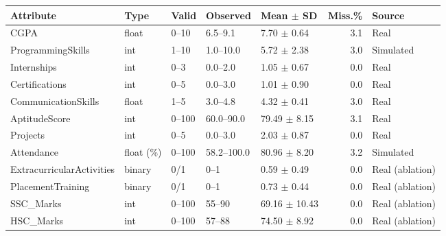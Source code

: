 \scriptsize
\setlength{\tabcolsep}{3pt}
\begin{tabular}{lllllrl}
\toprule
Attribute & Type & Valid & Observed & Mean $\pm$ SD & Miss.\% & Source \\
\midrule
CGPA & float & 0--10 & 6.5--9.1 & 7.70 $\pm$ 0.64 & 3.1 & Real \\
ProgrammingSkills & int & 1--10 & 1.0--10.0 & 5.72 $\pm$ 2.38 & 3.0 & Simulated \\
Internships & int & 0--3 & 0.0--2.0 & 1.05 $\pm$ 0.67 & 0.0 & Real \\
Certifications & int & 0--5 & 0.0--3.0 & 1.01 $\pm$ 0.90 & 0.0 & Real \\
CommunicationSkills & float & 1--5 & 3.0--4.8 & 4.32 $\pm$ 0.41 & 3.0 & Real \\
AptitudeScore & int & 0--100 & 60.0--90.0 & 79.49 $\pm$ 8.15 & 3.1 & Real \\
Projects & int & 0--5 & 0.0--3.0 & 2.03 $\pm$ 0.87 & 0.0 & Real \\
Attendance & float (\%) & 0--100 & 58.2--100.0 & 80.96 $\pm$ 8.20 & 3.2 & Simulated \\
ExtracurricularActivities & binary & 0/1 & 0--1 & 0.59 $\pm$ 0.49 & 0.0 & Real (ablation) \\
PlacementTraining & binary & 0/1 & 0--1 & 0.73 $\pm$ 0.44 & 0.0 & Real (ablation) \\
SSC\_Marks & int & 0--100 & 55--90 & 69.16 $\pm$ 10.43 & 0.0 & Real (ablation) \\
HSC\_Marks & int & 0--100 & 57--88 & 74.50 $\pm$ 8.92 & 0.0 & Real (ablation) \\
\bottomrule
\end{tabular}
